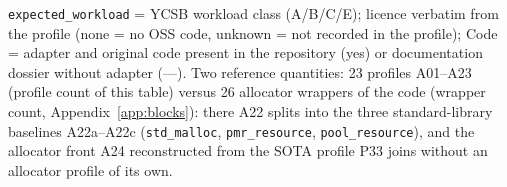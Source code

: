 \begin{table}[!htbp]
  \smallskip
  {\footnotesize \texttt{expected\_workload} = YCSB workload class (A/B/C/E); licence verbatim from the profile
  (none = no OSS code, unknown = not recorded in the profile); Code = adapter and original code present in the
  repository (yes) or documentation dossier without adapter (---). Two reference quantities: 23 profiles A01--A23
  (profile count of this table) versus 26 allocator wrappers of the code (wrapper count,
  Appendix~\ref{app:blocks}): there A22 splits into the three standard-library baselines A22a--A22c
  (\texttt{std\_malloc}, \texttt{pmr\_resource}, \texttt{pool\_resource}), and the allocator front A24
  reconstructed from the SOTA profile P33 joins without an allocator profile of its own.\par}
\end{table}

